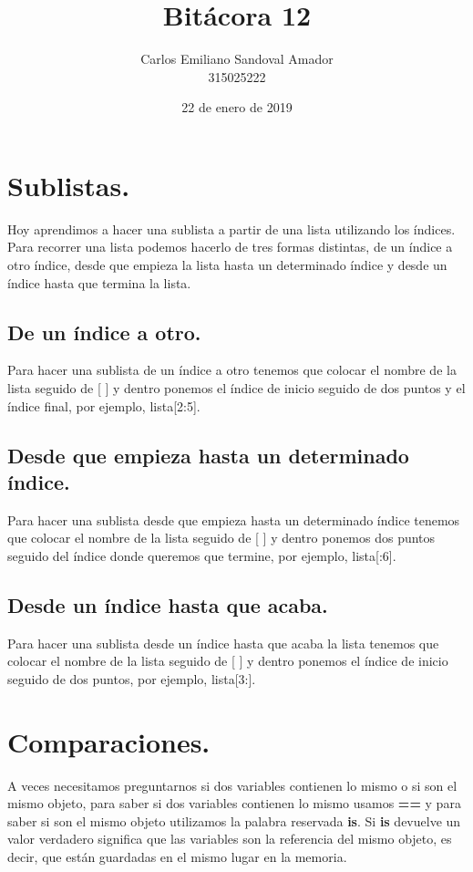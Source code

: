 \documentclass[letterpaper, 12pt, oneside]{article}%
\title{Bitácora 12}
\author{Carlos Emiliano Sandoval Amador \\ 315025222}
\date{22 de enero de 2019}
\begin{document}
	\maketitle %
	\section{Sublistas.} %
	Hoy aprendimos a hacer una sublista a partir de una lista utilizando los índices. Para recorrer una lista podemos hacerlo de tres formas distintas, de un índice a otro índice, desde que empieza la lista hasta un determinado índice y desde un índice hasta que termina la lista.
	\subsection{De un índice a otro.}
	Para hacer una sublista de un índice a otro tenemos que colocar el nombre de la lista seguido de [ ] y dentro ponemos el índice de inicio seguido de dos puntos y el índice final, por ejemplo, lista[2:5].
	\subsection{Desde que empieza hasta un determinado índice.}
	Para hacer una sublista desde que empieza hasta un determinado índice tenemos que colocar el nombre de la lista seguido de [ ] y dentro ponemos dos puntos seguido del índice donde queremos que termine, por ejemplo, lista[:6].
	\subsection{Desde un índice hasta que acaba.}
	Para hacer una sublista desde un índice hasta que acaba la lista tenemos que colocar el nombre de la lista seguido de [ ] y dentro ponemos el índice de inicio seguido de dos puntos, por ejemplo, lista[3:].
	\section{Comparaciones.}
	A veces necesitamos preguntarnos si dos variables contienen lo mismo o si son el mismo objeto, para saber si dos variables contienen lo mismo usamos \textbf{==} y para saber si son el mismo objeto utilizamos la palabra reservada \textbf{is}. Si \textbf{is} devuelve un valor verdadero significa que las variables son la referencia del mismo objeto, es decir, que están guardadas en el mismo lugar en la memoria.
\end{document}

